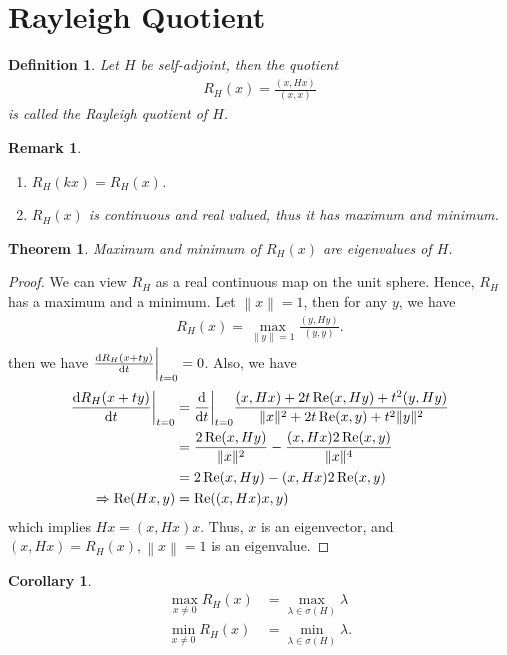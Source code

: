 \documentclass[10pt]{book}
\newtheorem{definition}{Definition}[chapter]
\newtheorem{theorem}{Theorem}[chapter]
\newtheorem{corollary}{Corollary}[theorem]
\newtheorem{remark}{Remark}[chapter]
\theoremstyle{definition}
\numberwithin{equation}{chapter}
\begin{document}
\medskip

\section{Rayleigh Quotient}

\begin{definition}
Let $H$ be self-adjoint, then the quotient
\begin{align*}
    R_H(x) = \frac{(x,Hx)}{(x,x)}
\end{align*}
is called the Rayleigh quotient of $H$.
\end{definition}

\begin{remark}
~\begin{enumerate}[label=(\arabic*)]
    \item $R_H(kx) = R_H(x)$.
    \item $R_H(x)$ is continuous and real valued, thus it has maximum and minimum.
\end{enumerate}
\end{remark}

\medskip

\begin{theorem}
Maximum and minimum of $R_H(x)$ are eigenvalues of $H$.
\end{theorem}
\begin{proof}
We can view $R_H$ as a real continuous map on the unit sphere. Hence, $R_H$ has a maximum and a minimum. Let $\left\|x\right\| =1$, then for any $y$, we have 
\begin{align*}
    R_H(x) = \max_{\|y\|=1} \frac{(y,Hy)}{(y,y)}.
\end{align*}
then we have $\dv{R_H(x+ty)}{t}\bigg|_{t = 0} = 0$. Also, we have
\begin{align*}
    \dv{R_H(x+ty)}{t}\bigg|_{t = 0} & = \dv{}{t}\bigg|_{t = 0} \frac{(x,Hx) + 2t\Re (x,Hy) + t^2 (y,Hy)}{\|x\|^2 + 2t \Re (x,y) + t^2 \|y\|^2} \\
    & = \frac{2\Re (x,Hy)}{\|x\|^2} - \frac{(x,Hx) 2 \Re (x,y)}{\|x\|^4} \\
    & = 2\Re (x,Hy) - (x,Hx) 2 \Re (x,y) \\
    \Rightarrow \Re (Hx,y) & =  \Re ((x,Hx)x,y)
\end{align*}
which implies $Hx = (x,Hx)x$. Thus, $x$ is an eigenvector, and $(x,Hx) = R_H(x), \left\|x\right\| = 1$ is an eigenvalue.
\end{proof}

\medskip

\begin{corollary}
\begin{align*}
    \max_{x\neq 0}R_H(x) & = \max_{\lambda\in \sigma(H)}\lambda \\
    \min_{x\neq 0}R_H(x) & = \min_{\lambda\in \sigma(H)}\lambda.
\end{align*}
\end{corollary}
\end{document}
